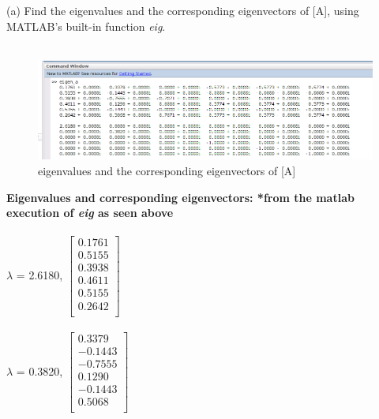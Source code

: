 \documentclass{report}
\begin{document}
    (a) Find the eigenvalues and the corresponding eigenvectors of [A], using MATLAB's built-in function \textit{eig}.\\\\

        

        \begin{figure}[h!]
            \includegraphics[width=\linewidth]{eigenVals_and_eigenVecs.png}
            \caption{eigenvalues and the corresponding eigenvectors of [A]}
            \label{fig:eigenVals_and_eigenVecs}
        \end{figure}

        \textbf{Eigenvalues and corresponding eigenvectors: *from the matlab execution of \textit{eig} as seen above} \\\\
        $\lambda$ = 2.6180, {$\begin{bmatrix}
                                0.1761 \\
                                0.5155 \\
                                0.3938 \\
                                0.4611 \\
                                0.5155 \\
                                0.2642 \\
                            \end{bmatrix}$}\\\\

        $\lambda$ = 0.3820, {$\begin{bmatrix}
                                0.3379 \\
                                -0.1443 \\
                                -0.7555 \\
                                0.1290 \\
                                -0.1443 \\
                                0.5068 \\
                            \end{bmatrix}$}\\\\
\end{document}
